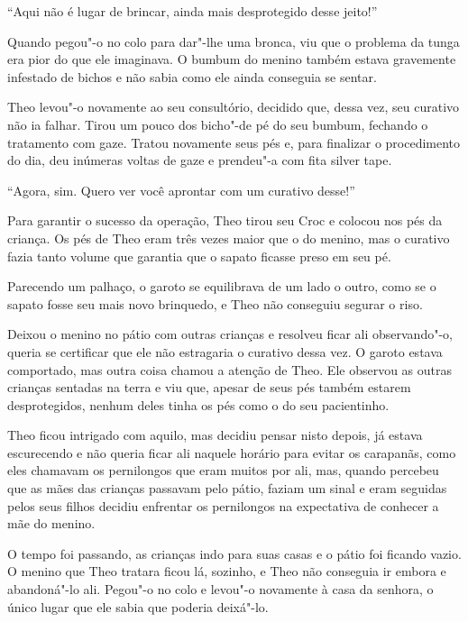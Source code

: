 ``Aqui não é lugar de brincar, ainda mais desprotegido desse jeito!''

Quando pegou"-o no colo para dar"-lhe uma bronca, viu que o problema da
tunga era pior do que ele imaginava. O bumbum do menino também estava
gravemente infestado de bichos e não sabia como ele ainda conseguia se
sentar.

Theo levou"-o novamente ao seu consultório, decidido que, dessa vez, seu
curativo não ia falhar. Tirou um pouco dos bicho"-de pé do seu bumbum,
fechando o tratamento com gaze. Tratou novamente seus pés e, para
finalizar o procedimento do dia, deu inúmeras voltas de gaze e prendeu"-a
com fita silver tape.

``Agora, sim. Quero ver você aprontar com um curativo desse!''

Para garantir o sucesso da operação, Theo tirou seu Croc e colocou nos
pés da criança. Os pés de Theo eram três vezes maior que o do menino,
mas o curativo fazia tanto volume que garantia que o sapato ficasse
preso em seu pé.

Parecendo um palhaço, o garoto se equilibrava de um lado o outro, como
se o sapato fosse seu mais novo brinquedo, e Theo não conseguiu segurar
o riso.

Deixou o menino no pátio com outras crianças e resolveu ficar ali
observando"-o, queria se certificar que ele não estragaria o curativo
dessa vez. O garoto estava comportado, mas outra coisa chamou a atenção
de Theo. Ele observou as outras crianças sentadas na terra e viu que,
apesar de seus pés também estarem desprotegidos, nenhum deles tinha os
pés como o do seu pacientinho.

Theo ficou intrigado com aquilo, mas decidiu pensar nisto depois, já
estava escurecendo e não queria ficar ali naquele horário para evitar os
carapanãs, como eles chamavam os pernilongos que eram muitos por ali,
mas, quando percebeu que as mães das crianças passavam pelo pátio,
faziam um sinal e eram seguidas pelos seus filhos decidiu enfrentar os
pernilongos na expectativa de conhecer a mãe do menino.

O tempo foi passando, as crianças indo para suas casas e o pátio foi
ficando vazio. O menino que Theo tratara ficou lá, sozinho, e Theo não
conseguia ir embora e abandoná"-lo ali. Pegou"-o no colo e levou"-o
novamente à casa da senhora, o único lugar que ele sabia que poderia
deixá"-lo.

\asterisc


